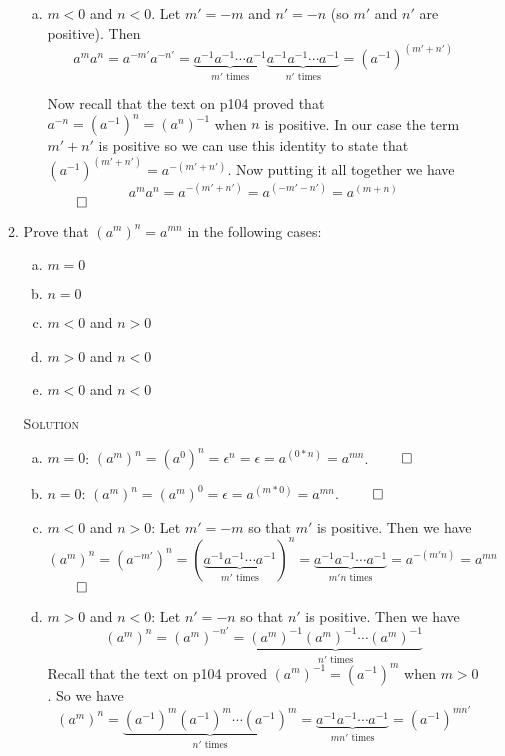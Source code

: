 \documentclass[twoside]{amsart}
\newcommand{\solution}{\textsc{Solution}\xspace}
\newcommand{\blank}{\vspace{5pt}}
\begin{document}
\begin{enumerate}[A.]
\begin{enumerate}[1]
\begin{enumerate}[(a)]
         \item $m<0$ and $n<0$. Let $m'=-m$ and $n'=-n$ (so $m'$ and
         $n'$ are positive). Then
         \[a^m a^n = a^{-m'} a^{-n'} = \underbrace{a^{-1} a^{-1}
         \cdots a^{-1}}_{m'\text{ times}} \underbrace{a^{-1} a^{-1} \cdots
         a^{-1}}_{n'\text{ times}} = (a^{-1})^{(m'+n')} \]

         Now recall that the text on p104 proved that $a^{-n} =
         (a^{-1})^n = (a^n)^{-1}$ when $n$ is positive. In our
         case the term $m'+n'$ is positive so we can use
         this identity to state that $(a^{-1})^{(m'+n')} = 
         a^{-(m'+n')}$. Now putting it all together we have
         \[
         a^m a^n = a^{-(m'+n')} = a^{(-m' - n')} = a^{(m+n)} 
         \]
         $\qed$

      \end{enumerate}

      \blank
      \item Prove that $(a^m)^n = a^{mn}$ in the following cases:
      \begin{enumerate}[(a)]
         \item $m=0$
         \item $n=0$
         \item $m<0$ and $n>0$
         \item $m>0$ and $n<0$
         \item $m<0$ and $n<0$
      \end{enumerate}

      \blank \noindent \solution
      \begin{enumerate}[(a)]
         \item $m=0$: $(a^m)^n = (a^0)^n = \epsilon^n = \epsilon
         = a^{(0*n)} = a^{mn}$. $\qed$

         \item $n=0$: $(a^m)^n = (a^m)^0 = \epsilon = a^{(m*0)} =
         a^{mn}$. $\qed$

         \item $m<0$ and $n>0$: Let $m' = -m$ so that $m'$ is positive.
         Then we have
         \[
            (a^m)^n = (a^{-m'})^n = (\underbrace{a^{-1} a^{-1} \cdots
            a^{-1}}_{m'\text{ times}})^n = \underbrace{a^{-1} a^{-1} \cdots
            a^{-1}}_{m'n\text{ times}} = a^{-(m'n)} = a^{mn}
         \] $\qed$

         \item $m>0$ and $n<0$: Let $n' = -n$ so that $n'$ is positive.
         Then we have
         \[
            (a^m)^n = (a^m)^{-n'} = \underbrace{(a^m)^{-1} (a^m)^{-1} 
            \cdots (a^m)^{-1}}_{ n'\text{ times}}
         \]
         Recall that the text on p104 proved $(a^m)^{-1} = (a^{-1})^m$ when
         $m >0$. So we have
         \[
           (a^m)^n = \underbrace{(a^{-1})^m (a^{-1})^m \cdots (a^{-1})^m}_{
           n'\text{ times}} = \underbrace{a^{-1} a^{-1} \cdots a^{-1}}_{
           mn'\text{ times}} = (a^{-1})^{mn'}
         \]


\end{enumerate}
\end{enumerate}
\end{enumerate}
\end{document}
